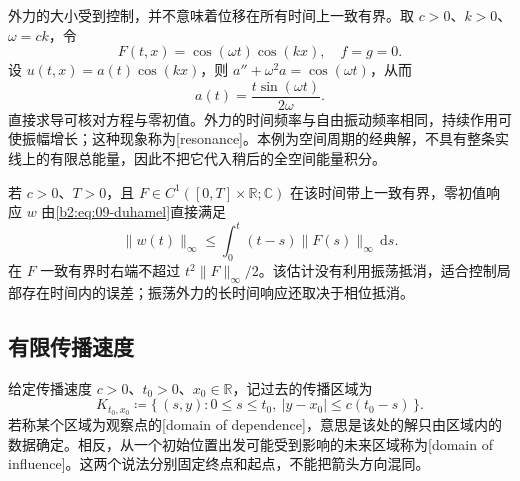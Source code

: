 \ProseParagraphBreak

外力的大小受到控制，并不意味着位移在所有时间上一致有界。取 \(c>0\)、\(k>0\)、\(\omega=ck\)，令
\[
 F(t,x)=\cos(\omega t)\cos(kx),\quad f=g=0.
\]
设 \(u(t,x)=a(t)\cos(kx)\)，则 \(a''+\omega^2a=\cos(\omega t)\)，从而
\[
 a(t)=\dfrac{t\sin(\omega t)}{2\omega}.
\]
直接求导可核对方程与零初值。外力的时间频率与自由振动频率相同，持续作用可使振幅增长；这种现象称为[resonance]。本例为空间周期的经典解，不具有整条实线上的有限总能量，因此不把它代入稍后的全空间能量积分。

\ProseParagraphBreak

若 \(c>0\)、\(T>0\)，且 \(F\in C^1([0,T]\times\mathbb R;\mathbb C)\) 在该时间带上一致有界，零初值响应 \(w\) 由\eqref{b2:eq:09-duhamel}直接满足
\[
 \|w(t)\|_\infty\leq\int_0^t(t-s)\|F(s)\|_\infty\,\mathrm{d}s.
\]
在 \(F\) 一致有界时右端不超过 \(t^2\|F\|_\infty/2\)。该估计没有利用振荡抵消，适合控制局部存在时间内的误差；振荡外力的长时间响应还取决于相位抵消。

\subsection{有限传播速度}
\label{b2:subsec:090203}

给定传播速度 \(c>0\)、\(t_0>0\)、\(x_0\in\mathbb R\)，记过去的传播区域为
\[
 K_{t_0,x_0}\coloneqq
 \{\,(s,y):0\leq s\leq t_0,\ |y-x_0|\leq c(t_0-s)\,\}.
\]
若称某个区域为观察点的[domain of dependence]，意思是该处的解只由区域内的数据确定。相反，从一个初始位置出发可能受到影响的未来区域称为[domain of influence]。这两个说法分别固定终点和起点，不能把箭头方向混同。

